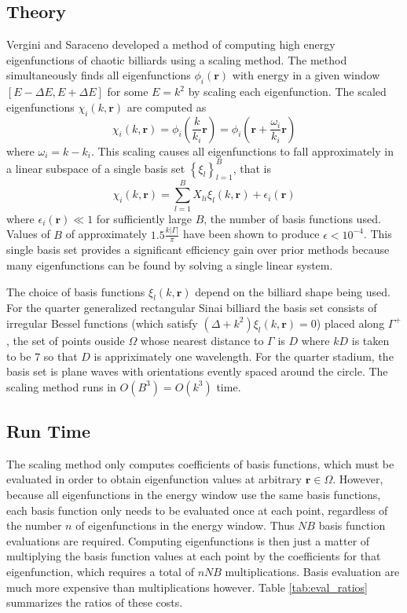 \documentclass{report}
\newcommand{\rr}[0]{\mathbf{r}}
\begin{document}
\subsection{Theory}
Vergini and Saraceno \cite{vergini} developed a method of computing high energy eigenfunctions of chaotic billiards using a scaling method. The method simultaneously finds all eigenfunctions $\phi_{i}(\rr)$ with energy in a given window $[E - \Delta E, E + \Delta E]$ for some $E = k^{2}$ by scaling each eigenfunction. The scaled eigenfunctions $\chi_{i}(k, \rr)$ are computed as
\[
\chi_{i}(k, \rr) = \phi_{i} \left( \frac{k}{k_{i}} \rr \right) = \phi_{i} \left( \rr + \frac{\omega_{i}}{k_i} \rr \right)
\]
where $\omega_{i} = k - k_i$. This scaling causes all eigenfunctions to fall approximately in a linear subspace of a single basis set $\left\{ \xi_{l} \right\}_{l=1}^{B}$, that is
\[
\chi_{i}(k, \rr) = \sum_{l=1}^{B} X_{li} \xi_{l}(k, \rr) + \epsilon_{i}(\rr)
\]
where $\epsilon_{i}(\rr) \ll 1$ for sufficiently large $B$, the number of basis functions used. Values of $B$ of approximately $1.5 \frac{k \vert \Gamma \vert}{\pi}$ have been shown to produce $\epsilon < 10^{-4}$. This single basis set provides a significant efficiency gain over prior methods because many eigenfunctions can be found by solving a single linear system.

The choice of basis functions $\xi_{l}(k, \rr)$ depend on the billiard shape being used. For the quarter generalized rectangular Sinai billiard the basis set consists of irregular Bessel functions (which satisfy $(\Delta + k^2)\xi_{l}(k, \rr) = 0$) placed along $\Gamma^{+}$, the set of points ouside $\Omega$ whose nearest distance to $\Gamma$ is $D$ where $kD$ is taken to be $7$ so that $D$ is appriximately one wavelength. For the quarter stadium, the basis set is plane waves with orientations evently spaced around the circle. The scaling method runs in $O(B^{3}) = O(k^{3})$ time. \cite{barnett}

\subsection{Run Time}
The scaling method only computes coefficients of basis functions, which must be evaluated in order to obtain eigenfunction values at arbitrary $\rr \in \Omega$. However, because all eigenfunctions in the energy window use the same basis functions, each basis function only needs to be evaluated once at each point, regardless of the number $n$ of eigenfunctions in the energy window. Thus $NB$ basis function evaluations are required. Computing eigenfunctions is then just a matter of multiplying the basis function values at each point by the coefficients for that eigenfunction, which requires a total of $nNB$ multiplications. Basis evaluation are much more expensive than multiplications however. Table \ref{tab:eval_ratios} summarizes the ratios of these costs.
\end{document}
